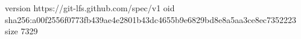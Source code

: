 version https://git-lfs.github.com/spec/v1
oid sha256:a00f2556f0773fb439ae4e2801b43dc4655b9e6829bd8e8a5aa3ce8ec7352223
size 7329
